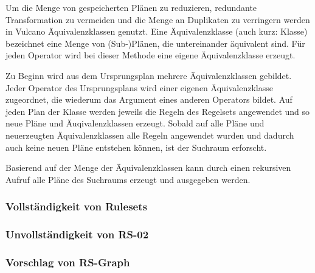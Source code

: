 Um die Menge von gespeicherten Plänen zu reduzieren, redundante Transformation zu vermeiden und die Menge an Duplikaten zu verringern werden in Vulcano Äquivalenzklassen genutzt. Eine Äquivalenzklasse (auch kurz: Klasse) bezeichnet eine Menge von (Sub-)Plänen, die untereinander äquivalent sind. Für jeden Operator wird bei dieser Methode eine eigene Äquivalenzklasse erzeugt.

Zu Beginn wird aus dem Ursprungsplan mehrere Äquivalenzklassen gebildet. Jeder Operator des Ursprungsplans wird einer eigenen Äquivalenzklasse zugeordnet, die wiederum das Argument eines anderen Operators bildet. Auf jeden Plan der Klasse werden jeweils die Regeln des Regelsets angewendet und so neue Pläne und Äuqivalenzklassen erzeugt. Sobald auf alle Pläne und neuerzeugten Äquivalenzklassen alle Regeln angewendet wurden und dadurch auch keine neuen Pläne entstehen können, ist der Suchraum erforscht.

Basierend auf der Menge der Äquivalenzklassen kann durch einen rekursiven Aufruf alle Pläne des Suchraums erzeugt und ausgegeben werden.


\subsubsection{Vollständigkeit von Rulesets}

\cite{shanbhag2014optimizing}

\subsubsection{Unvollständigkeit von RS-02}

\subsubsection{Vorschlag von RS-Graph}

\cite{shanbhag2014optimizing}